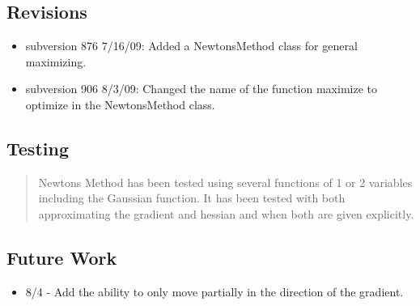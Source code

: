 \subsection*{Revisions}

\begin{itemize}
\item subversion 876 7/16/09: Added a NewtonsMethod class for general
maximizing.

\item subversion 906 8/3/09: Changed the name of the function maximize to
optimize in the NewtonsMethod class.
\end{itemize}

\subsection*{Testing}

\begin{quotation}
Newtons Method has been tested using several functions of 1 or 2 variables
including the Gaussian function. It has been tested with both approximating
the gradient and hessian and when both are given explicitly.
\end{quotation}

\subsection*{Future Work}

\begin{itemize}
\item 8/4 - Add the ability to only move partially in the direction of the
gradient.
\end{itemize}


%
